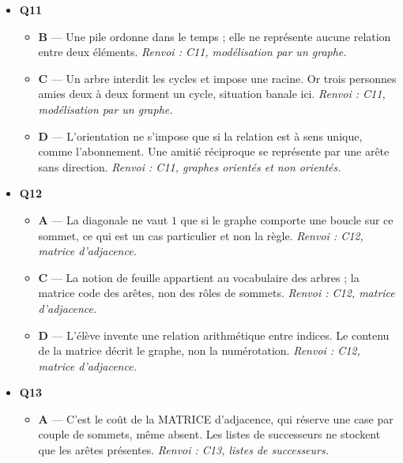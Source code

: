 \begin{itemize}
\begin{itemize}
    \item \textbf{B} — C'est encore la hauteur, exprimée par le nombre de niveaux. La taille dénombre les nœuds, pas les niveaux. \emph{Renvoi : C10, taille, hauteur et feuilles.}
    \item \textbf{C} — Les feuilles ne forment qu'une partie des nœuds ; les nœuds internes comptent aussi dans la taille. \emph{Renvoi : C10, taille, hauteur et feuilles.}
  \end{itemize}
  \item \textbf{Q11}
  \begin{itemize}
    \item \textbf{B} — Une pile ordonne dans le temps ; elle ne représente aucune relation entre deux éléments. \emph{Renvoi : C11, modélisation par un graphe.}
    \item \textbf{C} — Un arbre interdit les cycles et impose une racine. Or trois personnes amies deux à deux forment un cycle, situation banale ici. \emph{Renvoi : C11, modélisation par un graphe.}
    \item \textbf{D} — L'orientation ne s'impose que si la relation est à sens unique, comme l'abonnement. Une amitié réciproque se représente par une arête sans direction. \emph{Renvoi : C11, graphes orientés et non orientés.}
  \end{itemize}
  \item \textbf{Q12}
  \begin{itemize}
    \item \textbf{A} — La diagonale ne vaut $1$ que si le graphe comporte une boucle sur ce sommet, ce qui est un cas particulier et non la règle. \emph{Renvoi : C12, matrice d'adjacence.}
    \item \textbf{C} — La notion de feuille appartient au vocabulaire des arbres ; la matrice code des arêtes, non des rôles de sommets. \emph{Renvoi : C12, matrice d'adjacence.}
    \item \textbf{D} — L'élève invente une relation arithmétique entre indices. Le contenu de la matrice décrit le graphe, non la numérotation. \emph{Renvoi : C12, matrice d'adjacence.}
  \end{itemize}
  \item \textbf{Q13}
  \begin{itemize}
    \item \textbf{A} — C'est le coût de la MATRICE d'adjacence, qui réserve une case par couple de sommets, même absent. Les listes de successeurs ne stockent que les arêtes présentes. \emph{Renvoi : C13, listes de successeurs.}

\end{itemize}
\end{itemize}
